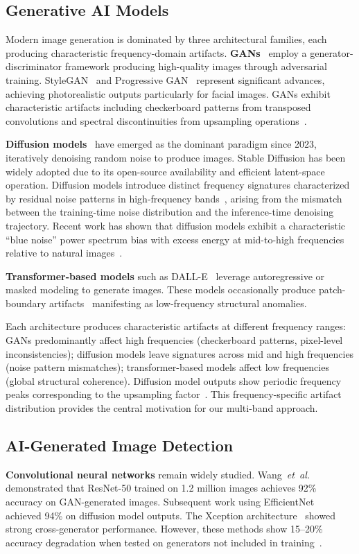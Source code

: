 \documentclass[journal]{IEEEtran}
\begin{document}
\subsection{Generative AI Models}
Modern image generation is dominated by three architectural families, each producing characteristic frequency-domain artifacts. \textbf{GANs}~\cite{goodfellow2014} employ a generator-discriminator framework producing high-quality images through adversarial training. StyleGAN~\cite{karras2019} and Progressive GAN~\cite{karras2018} represent significant advances, achieving photorealistic outputs particularly for facial images. GANs exhibit characteristic artifacts including checkerboard patterns from transposed convolutions and spectral discontinuities from upsampling operations~\cite{zhang2022}.

\textbf{Diffusion models}~\cite{ho2020, rombach2022} have emerged as the dominant paradigm since 2023, iteratively denoising random noise to produce images. Stable Diffusion has been widely adopted due to its open-source availability and efficient latent-space operation. Diffusion models introduce distinct frequency signatures characterized by residual noise patterns in high-frequency bands~\cite{wolter2024}, arising from the mismatch between the training-time noise distribution and the inference-time denoising trajectory. Recent work has shown that diffusion models exhibit a characteristic ``blue noise'' power spectrum bias with excess energy at mid-to-high frequencies relative to natural images~\cite{wolter2024}.

\textbf{Transformer-based models} such as DALL-E~\cite{betker2023} leverage autoregressive or masked modeling to generate images. These models occasionally produce patch-boundary artifacts~\cite{dravida2023} manifesting as low-frequency structural anomalies.

Each architecture produces characteristic artifacts at different frequency ranges: GANs predominantly affect high frequencies (checkerboard patterns, pixel-level inconsistencies); diffusion models leave signatures across mid and high frequencies (noise pattern mismatches); transformer-based models affect low frequencies (global structural coherence). Diffusion model outputs show periodic frequency peaks corresponding to the upsampling factor~\cite{wolter2024}. This frequency-specific artifact distribution provides the central motivation for our multi-band approach.

\subsection{AI-Generated Image Detection}
\textbf{Convolutional neural networks} remain widely studied. Wang~\textit{et~al.}~\cite{wang2020} demonstrated that ResNet-50 trained on 1.2 million images achieves 92\% accuracy on GAN-generated images. Subsequent work using EfficientNet~\cite{tan2019} achieved 94\% on diffusion model outputs. The Xception architecture~\cite{chollet2017} showed strong cross-generator performance. However, these methods show 15--20\% accuracy degradation when tested on generators not included in training~\cite{guarnera2022}.
\end{document}
